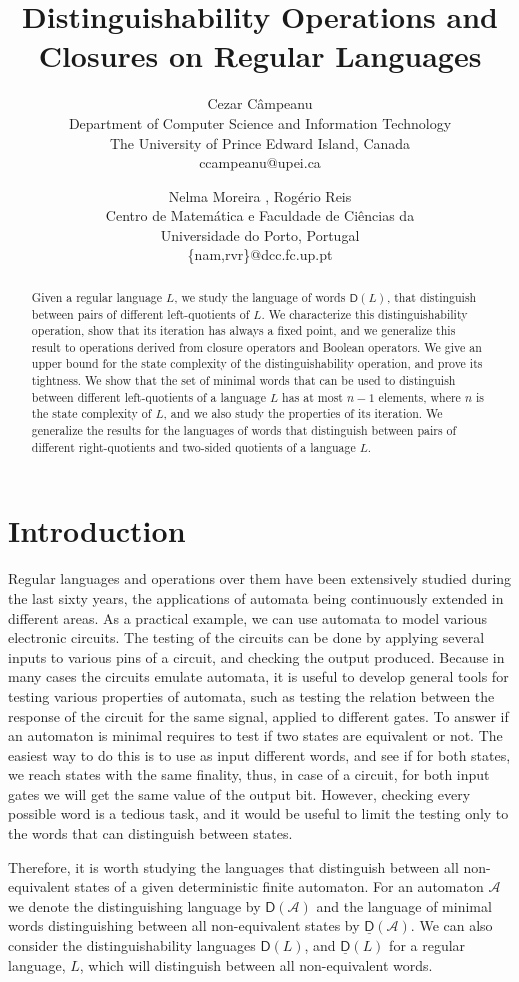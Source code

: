 \documentclass{article}
\date{}
\title{Distinguishability Operations  and Closures on Regular Languages}
\author{Cezar C\^ampeanu \\
Department of Computer Science and Information Technology\\
The University of Prince Edward Island, Canada\\ccampeanu@upei.ca
 \and Nelma Moreira
, Rogério Reis\\
 Centro de Matem\'atica e Faculdade de Ci\^e{}ncias da\\
   Universidade do Porto, Portugal  \\
\{nam,rvr\}@dcc.fc.up.pt}
\newcommand{\dis}[1]{\mathsf{D}(#1)}
\newcommand{\distmin}[1]{\underline{\mathsf{D}}(#1)}
\begin{document}
\maketitle

\begin{abstract}
 Given a regular language $L$, we study the language of words $\dis{L}$, that  distinguish between pairs of different
left-quotients of $L$. We characterize this distinguishability
operation, show that its iteration has always a fixed point,
and we generalize this result to operations derived from closure operators 
and Boolean operators. 
We give an upper bound for the state complexity of the distinguishability operation, 
and prove its tightness.  
We show that the set of minimal words that can be used to distinguish 
between different left-quotients of a language $L$ has at most $n-1$ elements,
 where $n$ is the state complexity of $L$, and 
 we also study the properties of its iteration. We generalize the results for the languages of words that distinguish between pairs of different right-quotients and two-sided quotients of a language $L$.
\end{abstract}

\section{Introduction}
\label{sec:intro}
Regular languages and operations over them have been extensively
studied  during the last sixty years, the applications of automata
being continuously extended in different areas. 
As a practical example, we can use automata to model various
electronic circuits. The testing of the circuits can be done by
applying several inputs to various pins of a circuit, and checking the output
produced. 
Because in many cases the circuits emulate automata, it is useful to
develop general tools for testing various properties of automata, such
as testing the relation between the response of the circuit for the
same signal, applied to different gates. 
To answer if an automaton is minimal requires to test if two states
are equivalent or not. 
The easiest way to do this is to use as input different words, and see if
for both states, we reach states with the same finality, thus, in case
of a circuit, for both input gates we will get the same value of the output bit.  
However, checking every possible word is a tedious task, and it would
be useful to limit the testing only to the words that can distinguish
between states. 

Therefore, it is worth studying the languages that distinguish between all
non-equivalent states of a given deterministic finite automaton. 
For an automaton  $\mathcal{A}$ we denote the distinguishing  
language by $\dis{\mathcal{A}}$ and the language of minimal words
distinguishing between all non-equivalent states by $\distmin{\mathcal{A}}$. We can also consider the distinguishability 
languages $\dis{L}$, and $\distmin{L}$ for a regular language, $L$,
which will distinguish between all non-equivalent words.
\end{document}
